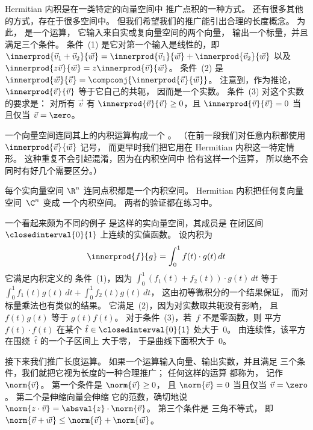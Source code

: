 Hermitian 内积是在一类特定的向量空间中
推广点积的一种方式。
还有很多其他的方式，存在于很多空间中。
但我们希望我们的推广能引出合理的长度概念。
为此，
是一个运算，
它输入来自实或复向量空间的两个向量，
输出一个标量，并且
满足三个条件。
条件~(1) 是它对第一个输入是线性的，即
$\innerprod{\vec{v}_1+\vec{v}_2}{\vec{w}}
 = \innerprod{\vec{v}_1}{\vec{w}}
   +\innerprod{\vec{v}_2}{\vec{w}}$
以及 $\innerprod{z\vec{v}}{\vec{w}}
     =z\innerprod{\vec{v}}{\vec{w}}$。
条件~(2) 是
$\innerprod{\vec{w}}{\vec{v}}=\compconj{\innerprod{\vec{v}}{\vec{w}}}$。
注意到，作为推论，
$\innerprod{\vec{v}}{\vec{v}}$ 等于它自己的共轭，
因而是一个实数。
条件~(3) 对这个实数的要求是：
对所有 $\vec{v}$ 有 $\innerprod{\vec{v}}{\vec{v}}\geq 0$，且
$\innerprod{\vec{v}}{\vec{v}}= 0$ 当且仅当 $\vec{v}=\zero$。

一个向量空间连同其上的内积运算构成一个
。
（在前一段我们对任意内积都使用 $\innerprod{\vec{v}}{\vec{w}}$ 记号，
而更早时我们把它用在 Hermitian 内积这一特定情形。
这种重复不会引起混淆，因为在内积空间中
恰有这样一个运算，
所以绝不会同时有好几个需要区分。）

每个实向量空间 $\R^n$ 连同点积都是一个内积空间。
Hermitian 内积把任何复向量空间~$\C^n$ 变成
一个内积空间。
两者的验证都在练习中。

一个看起来颇为不同的例子
是这样的实向量空间，其成员是
在闭区间
$\closedinterval{0}{1}$ 上连续的实值函数。
设内积为
\begin{equation*}
  \innerprod{f}{g}=\int_{0}^1 f(t)\cdot g(t)\,dt
\end{equation*}
它满足内积定义的
条件~(1)，因为
$\int_{0}^1 (f_1(t)+f_2(t))\cdot g(t)\,dt$ 等于
$\int_{0}^1 f_1(t)g(t)\,dt+\int_{0}^1 f_2(t)g(t)\,dt$，
这由初等微积分的一个结果保证，
而对标量乘法也有类似的结果。
它满足~(2)，因为对实数取共轭没有影响，
且 $f(t)g(t)$ 等于 $g(t)f(t)$。
对于条件~(3)，若~$f$ 不是零函数，则
平方 $f(t)\cdot f(t)$ 在某个
$\hat{t}\in \closedinterval{0}{1}$ 处大于~$0$。
由连续性，该平方在围绕~$\hat{t}$ 的一个子区间上
大于零，
于是曲线下面积大于~$0$。

接下来我们推广长度运算。
如果一个运算输入向量、输出实数，并且满足
三个条件，我们就把它视为长度的一种合理推广；
任何这样的运算
都称为， 记作~$\norm{\vec{v}}$。
第一个条件是 $\norm{\vec{v}}\geq 0$，
且 $\norm{\vec{v}}= 0$ 当且仅当 $\vec{v}=\zero$。
第二个是伸缩向量会伸缩
它的范数，确切地说
$\norm{z\cdot \vec{v}}=\absval{z}\cdot\norm{\vec{v}}$。
第三个条件是
三角不等式，
即 $\norm{\vec{v}+\vec{w}}\leq\norm{\vec{v}}+\norm{\vec{w}}$。

